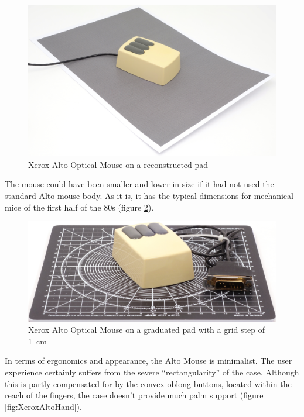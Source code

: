 \documentclass[11pt, a4paper]{article}
\begin{document}
\begin{figure}[h]
    \centering
    \includegraphics[scale=0.3]{1981_xerox_alto_mouse/pad_30.jpg}
    \caption{Xerox Alto Optical Mouse on a reconstructed pad}
    \label{fig:XeroxAltoPad}
\end{figure}

The mouse could have been smaller and lower in size if it had not used the standard Alto mouse body. As it is, it has the typical dimensions for mechanical mice of the first half of the 80s (figure \ref{fig:XeroxAltoSize}).

\begin{figure}[h]
    \centering
    \includegraphics[scale=0.4]{1981_xerox_alto_mouse/size_15.jpg}
    \caption{Xerox Alto Optical Mouse on a graduated pad with a grid step of 1~cm}
    \label{fig:XeroxAltoSize}
\end{figure}

In terms of ergonomics and appearance, the Alto Mouse is minimalist. The user experience certainly suffers from the severe ``rectangularity'' of the case. Although this is partly compensated for by the convex oblong buttons, located within the reach of the fingers, the case doesn't provide much palm support (figure \ref{fig:XeroxAltoHand}).
\end{document}
